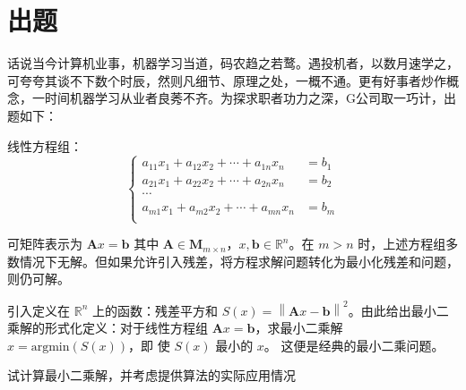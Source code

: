 
\section{出题}
话说当今计算机业事，机器学习当道，码农趋之若鹜。遇投机者，以数月速学之，可夸夸其谈不下数个时辰，然则凡细节、原理之处，一概不通。更有好事者炒作概念，一时间机器学习从业者良莠不齐。为探求职者功力之深，G公司取一巧计，出题如下：

线性方程组：
\[
	\begin{cases}
		a_{11}x_1+a_{12}x_2+\cdots+a_{1n}x_n & =b_1 \\
		a_{21}x_1+a_{22}x_2+\cdots+a_{2n}x_n & =b_2 \\
		\cdots                               &      \\
		a_{m1}x_1+a_{m2}x_2+\cdots+a_{mn}x_n & =b_m \\
	\end{cases}
\]

可矩阵表示为 $\boldsymbol Ax=\boldsymbol b$ 其中 $\boldsymbol A\in \boldsymbol M_{m\times n}$，$x,\boldsymbol b\in \mathbb{R}^n$。在 $m>n$ 时，上述方程组多数情况下无解。但如果允许引入残差，将方程求解问题转化为最小化残差和问题，则仍可解。

引入定义在 $\mathbb{R}^n$ 上的函数：残差平方和 $S(x)=\left\|\boldsymbol Ax-\boldsymbol b\right\|^2$。由此给出最小二乘解的形式化定义：对于线性方程组 $\boldsymbol Ax=\boldsymbol b$，求最小二乘解 $\hat x=\mathrm{argmin}(S(x))$，即 使 $S(x)$ 最小的 $x$。 这便是经典的最小二乘问题。
\begin{problem}
试计算最小二乘解，并考虑提供算法的实际应用情况
\end{problem}

